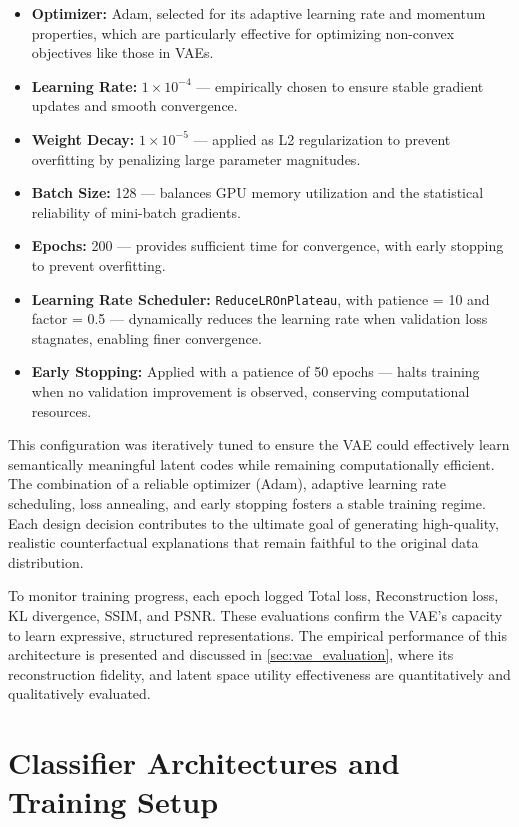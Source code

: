\begin{itemize}
    \item \textbf{Optimizer:} Adam, selected for its adaptive learning rate and momentum properties, which are particularly effective for optimizing non-convex objectives like those in VAEs.
    \item \textbf{Learning Rate:} $1 \times 10^{-4}$ — empirically chosen to ensure stable gradient updates and smooth convergence.
    \item \textbf{Weight Decay:} $1 \times 10^{-5}$ — applied as L2 regularization to prevent overfitting by penalizing large parameter magnitudes.
    \item \textbf{Batch Size:} 128 — balances GPU memory utilization and the statistical reliability of mini-batch gradients.
    \item \textbf{Epochs:} 200 — provides sufficient time for convergence, with early stopping to prevent overfitting.
    \item \textbf{Learning Rate Scheduler:} \texttt{ReduceLROnPlateau}, with patience = 10 and factor = 0.5 — dynamically reduces the learning rate when validation loss stagnates, enabling finer convergence.
    \item \textbf{Early Stopping:} Applied with a patience of 50 epochs — halts training when no validation improvement is observed, conserving computational resources.
\end{itemize}

This configuration was iteratively tuned to ensure the VAE could effectively learn semantically meaningful latent codes while remaining computationally efficient. The combination of a reliable optimizer (Adam), adaptive learning rate scheduling, loss annealing, and early stopping fosters a stable training regime. Each design decision contributes to the ultimate goal of generating high-quality, realistic counterfactual explanations that remain faithful to the original data distribution.

To monitor training progress, each epoch logged Total loss, Reconstruction loss, KL divergence, SSIM, and PSNR. These evaluations confirm the VAE's capacity to learn expressive, structured representations. The empirical performance of this architecture is presented and discussed in \cref{sec:vae_evaluation}, where its reconstruction fidelity, and latent space utility effectiveness are quantitatively and qualitatively evaluated.



\section{Classifier Architectures and Training Setup}
\label{sec:classifier_architectures}


